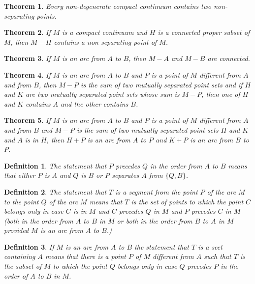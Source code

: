 \documentclass[10pt]{report}
\newtheorem{theorem}{Theorem}
\newtheorem{definition}{Definition}
\begin{document}
\begin{theorem}
 Every non-degenerate compact continuum contains two non-separating points.
\end{theorem}


\begin{theorem}
 If $M$ is a compact continuum and $H$ is a connected proper subset of $M$, then $M-H$ contains a non-separating point
of $M$.
\end{theorem}

\begin{theorem}
 If $M$ is an arc from $A$ to $B$, then $M-A$ and $M-B$ are connected.
\end{theorem}

\begin{theorem}
 If $M$ is an arc from $A$ to $B$ and $P$ is a point of $M$ different from $A$ and from $B$, then $M-P$ is the sum of
two mutually separated point sets and if $H$ and $K$ are two mutually separated point sets whose sum is $M-P$, then one
of $H$ and $K$ contains $A$ and the other contains $B$.
\end{theorem}

\begin{theorem}
 If $M$ is an arc from $A$ to $B$ and $P$ is a point of $M$ different from $A$ and from $B$ and $M-P$ is the sum of two
mutually separated point sets $H$ and $K$ and $A$ is in $H$, then $H+P$ is an arc from $A$ to $P$ and $K+P$ is an arc
from $B$ to $P$.
\end{theorem}

\begin{definition}
 The statement that $P$ precedes $Q$ in the order from $A$ to $B$ means that either $P$ is $A$ and $Q$ is $B$ or $P$
separates $A$ from $\{Q,B\}$.
\end{definition}

\begin{definition}
 The statement that $T$ is a segment from the point $P$ of the arc $M$ to the point $Q$ of the arc $M$ means that $T$
is the set of points to which the point $C$ belongs only in case $C$ is in $M$ and $C$ precedes $Q$ in $M$ and $P$
precedes $C$ in $M$ (both in the order from $A$ to $B$ in $M$ or both in the order from $B$ to $A$ in $M$ provided $M$
is an arc from $A$ to $B$.)
\end{definition}

\begin{definition}
 If $M$ is an arc from $A$ to $B$ the statement that $T$ is a sect containing $A$ means that there is a point $P$ of
$M$ different from $A$ such that $T$ is the subset of $M$ to which the point $Q$ belongs only in case $Q$ precedes $P$
in the order of $A$ to $B$ in $M$.
\end{definition}
\end{document}
